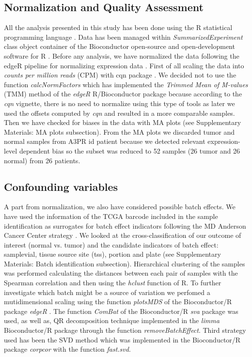 \documentclass[9pt,twocolumn,twoside]{gsajnl}
\begin{document}
\subsection*{Normalization and Quality Assessment}
All the analysis presented in this study has been done using the R statistical programming language \citep{R}. Data has been managed within \textit{SummarizedExperiment} class object container \citep{SummarizedExperiment} of the Bioconductor open-source and open-development software for R \citep{Gentleman2004}. Before any analysis, we have normalized the data following the edgeR pipeline for normalizing expression data \citep{Robinson2010}. First of all scaling the data into \textit{counts per million reads} (CPM) with cqn package \citep{Hansen2012}. We decided not to use the function \textit{calcNormFactors} which has implemented the \textit{Trimmed Mean of M-values} (TMM) method of the \textit{edgeR} R/Bioconductor package \citep{Robinson2010a} because according to the \textit{cqn} vignette, there is no need to normalize using this type of tools as later we used the offsets computed by \textit{cqn} \citep{Hansen2012} and resulted in a more comparable samples. 
Then we have checked for biases in the data with MA plots (see Supplementary Materials: MA plots subsection). From the MA plots we discarded tumor and normal samples from  A3PR id patient because we detected relevant expression-level dependent bias so the subset was reduced to 52 samples (26 tumor and 26 normal) from 26 patients.

\subsection*{Confounding variables}
A part from normalization, we also have considered possible batch effects. We have used the information of the TCGA barcode included in the sample identification as surrogates for batch effect indicators following the MD Anderson Cancer Center strategy \citep{batch}. We looked at the cross-classification of our outcome of interest (normal vs. tumor) and the candidate indicators of batch effect: samplevial, tissue source site (tss), portion and plate (see Supplementary Materials: Batch identification subsection). Hierarchical clustering of the samples was performed calculating the distances between each pair of samples with the Spearman correlation and then using the \textit{hclust} function of R. To further investigate which batch might be a source of variation we perfomed a mutidimensional scaling using the function \textit{plotsMDS} of the Bioconductor/R package \textit{edgeR} \citep{Robinson2010}. The function \textit{ComBat} of the Bioconductor/R \textit{sva} package \citep{sva} was used, as well as, QR decomposition technique implemented in the \textit{limma} Bioconductor/R package \citep{limma} through the function \textit{removeBatchEffect}. Third strategy used has been the SVD method \citep{Alter2000} which was implemented in the Bioconductor/R package \textit{corpcor} \citep{corpcor} with the function \textit{fast.svd}.
\end{document}
